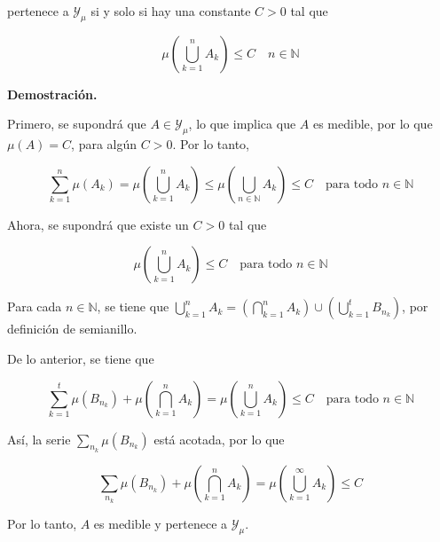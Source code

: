 \documentclass[fleqn]{article}
\begin{document}
\begin{enumerate}[a)]
		pertenece a $ \mathcal{Y}_\mu $ si y solo si hay una constante $ C > 0 $ tal que

		\begin{equation*}
			\mu \left( \bigcup_{k=1}^n A_k \right) \leq C \quad n \in \mathbb{N}
		\end{equation*}

		\textbf{Demostración.}

		Primero, se supondrá que $ A \in \mathcal{Y}_\mu $, lo que implica que $A$ es medible, por lo que $ \mu (A) = C $, para algún $ C > 0 $. Por lo tanto, 

		\begin{equation*}
			\sum_{k=1}^n \mu (A_k) = \mu \left( \bigcup_{k=1}^n A_k \right) \leq \mu \left( \bigcup_{n \in \mathbb{N}} A_k \right) \leq C \quad \mbox{para todo } n \in \mathbb{N}
		\end{equation*}

		Ahora, se supondrá que existe un $ C > 0 $ tal que 

		\begin{equation*}
			\mu \left( \bigcup_{k=1}^n A_k \right) \leq C  \quad \mbox{para todo } n \in \mathbb{N}
		\end{equation*}

        Para cada $ n \in \mathbb{N} $, se tiene que $ \displaystyle \bigcup_{k=1}^n A_k = \left( \bigcap_{k=1}^n A_k \right) \cup \left( \bigcup_{k=1}^t B_{n_k} \right) $, por definición de semianillo.
  
		De lo anterior, se tiene que

		\begin{equation*}
			\sum_{k=1}^t \mu (B_{n_k}) + \mu \left( \bigcap_{k=1}^n A_k \right) = \mu \left( \bigcup_{k=1}^n A_k \right) \leq C \quad \mbox{para todo } n \in \mathbb{N}
		\end{equation*}

        Así, la serie $ \displaystyle \sum_{n_k} \mu (B_{n_k}) $ está acotada, por lo que

        \begin{equation*}
			\sum_{n_k} \mu (B_{n_k}) + \mu \left( \bigcap_{k=1}^n A_k \right) = \mu \left( \bigcup_{k=1}^\infty A_k \right) \leq C
		\end{equation*}

        Por lo tanto, $ A $ es medible y pertenece a $ \mathcal{Y}_\mu $.
	\end{enumerate}
\end{document}
